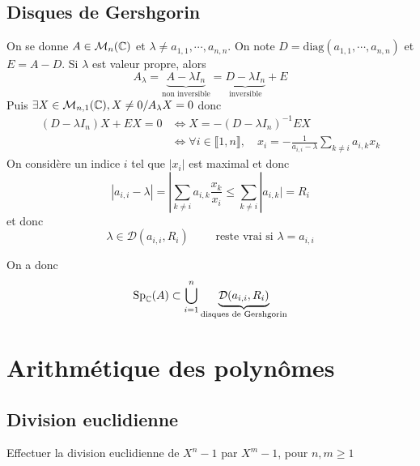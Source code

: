 \subsection{Disques de Gershgorin}


On se donne $A\in\mathcal M_n(\mathbb C)$ et $\lambda\neq a_{1, 1}, \cdots, a_{n, n}$. On note $D=\mathrm{diag} (a_{1, 1}, \cdots, a_{n, n})$ et $E=A-D$. Si $\lambda$ est valeur propre, alors \[
    A_\lambda=\underbrace{A-\lambda I_n}_{\text{non inversible}}=\underbrace{D-\lambda I_n}_{\text{inversible}}+E
\]
Puis $\exists X\in\mathcal M_{n, 1}(\mathbb C), X\neq 0 / A_\lambda X=0$ donc \begin{align*}
    (D-\lambda I_n)X+EX=0&\iff X=-(D-\lambda I_n)^{-1}EX \\&\iff \forall i\in\llbracket 1, n\rrbracket, \quad x_i=-\frac1{a_{i, i}-\lambda}\sum_{k\neq i}a_{i, k}x_k
\end{align*}
On considère un indice $i$ tel que $|x_i|$ est maximal et donc \[
    |a_{i, i}-\lambda|=|\sum_{k\neq i}a_{i, k}\frac{x_k}{x_i}\leq \sum_{k\neq i}|a_{i, k}|=R_i
\]
et donc \[
    \lambda\in\mathcal D(a_{i, i}, R_i) \qquad \text{ reste vrai si } \lambda=a_{i, i}
\]

On a donc \[
    \mathrm{Sp}_{\mathbb C}(A)\subset \bigcup_{i=1}^n \underbrace{\mathcal D(a_{i, i}, R_i)}_{\text{disques de Gershgorin}}
\]

\section{Arithmétique des polynômes}

\subsection{Division euclidienne}


\begin{exo}
    Effectuer la division euclidienne de $X^n-1$ par $X^m-1$, pour $n, m\geq 1$
\end{exo}


